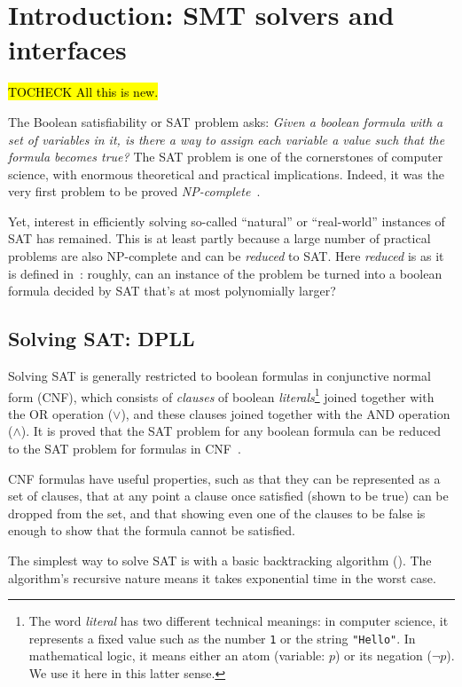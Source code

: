 \chapter{Introduction: SMT solvers and interfaces}
\label{chap:intro}

\hl{TOCHECK All this is new.}

The Boolean satisfiability or SAT problem asks: \textit{Given a boolean
formula with a set of variables in it, is there a way to assign each variable
a value such that the formula becomes true?} The SAT problem is one of the
cornerstones of computer science, with enormous theoretical and practical
implications. Indeed, it was the very first problem to be proved
\textit{NP-complete}~\cite{sat-npcomplete}.

Yet, interest in efficiently solving so-called ``natural'' or ``real-world''
instances of SAT has remained. This is at least partly because a large number
of practical problems are also NP-complete and can be \textit{reduced} to SAT.
Here \textit{reduced} is as it is defined in~\cite{karp21}: roughly, can an
instance of the problem be turned into a boolean formula decided by SAT that's
at most polynomially larger?

\section{Solving SAT: DPLL}

Solving SAT is generally restricted to boolean formulas in conjunctive normal
form (CNF), which consists of \textit{clauses} of boolean
\textit{literals}\footnote{The word \textit{literal} has two different
technical meanings: in computer science, it represents a fixed value such as
the number \texttt{1} or the string \texttt{"Hello"}. In mathematical logic,
it means either an atom (variable: $p$) or its negation ($\neg p$). We use it
here in this latter sense.} joined together with the OR operation ($\vee$),
and these clauses joined together with the AND operation ($\wedge$). It is
proved that the SAT problem for any boolean formula can be reduced to the SAT
problem for formulas in CNF~\cite{karp21}.

CNF formulas have useful properties, such as that they can be represented as a
set of clauses, that at any point a clause once satisfied (shown to be true)
can be dropped from the set, and that showing even one of the clauses to be
false is enough to show that the formula cannot be satisfied.

The simplest way to solve SAT is with a basic backtracking algorithm
(). The algorithm's recursive nature means it takes
exponential time in the worst case.

